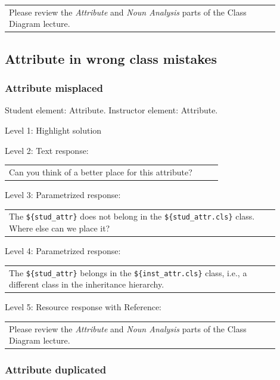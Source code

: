 \begin{tabular}{|p{0.9\linewidth}}
Please review the \textit{Attribute} and \textit{Noun Analysis} parts of the Class Diagram lecture.
\end{tabular} \medskip


\subsection{Attribute in wrong class mistakes}

\subsubsection{Attribute misplaced}

Student element: Attribute. Instructor element: Attribute. \medskip

\noindent Level 1: Highlight solution  \medskip

\noindent Level 2: Text response: \medskip

\begin{tabular}{|p{0.9\linewidth}}
Can you think of a better place for this attribute?
\end{tabular} \medskip

\noindent Level 3: Parametrized response: \medskip

\begin{tabular}{|p{0.9\linewidth}}
The \verb|${stud_attr}| does not belong in the \verb|${stud_attr.cls}| class. Where else can we place it?
\end{tabular} \medskip

\noindent Level 4: Parametrized response: \medskip

\begin{tabular}{|p{0.9\linewidth}}
The \verb|${stud_attr}| belongs in the \verb|${inst_attr.cls}| class, i.e., a different class in the inheritance hierarchy.
\end{tabular} \medskip

\noindent Level 5: Resource response with Reference: \medskip

\begin{tabular}{|p{0.9\linewidth}}
Please review the \textit{Attribute} and \textit{Noun Analysis} parts of the Class Diagram lecture.
\end{tabular} \medskip


\subsubsection{Attribute duplicated}

